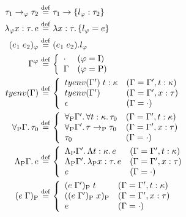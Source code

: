 \begin{align*}
  \tau_1 \to_\varphi \tau_2 &\mathrel{\overset{\mathrm{def}}{=}} \tau_1 \to \{l_\varphi: \tau_2\} \\
  \lambda_\varphi x: \tau\ldotp e &\mathrel{\overset{\mathrm{def}}{=}} \lambda x: \tau\ldotp \{l_\varphi = e\} \\
  (e_1\; e_2)_\varphi &\mathrel{\overset{\mathrm{def}}{=}} (e_1\; e_2).l_\varphi \\
  \Gamma^\varphi &\mathrel{\overset{\mathrm{def}}{=}} \left\{\begin{array}{ll}
    \cdot &(\varphi = \mathrm{I}) \\
    \Gamma &(\varphi = \mathrm{P})
  \end{array}\right. \\
  \mathop{tyenv}(\Gamma) &\mathrel{\overset{\mathrm{def}}{=}} \left\{\begin{array}{ll}
    \mathop{tyenv}(\Gamma')\; t: \kappa &(\Gamma = \Gamma', t: \kappa) \\
    \mathop{tyenv}(\Gamma') &(\Gamma = \Gamma', x: \tau) \\
    \epsilon &(\Gamma = \cdot)
  \end{array}\right. \\
  \forall_{\mathrm{P}} \Gamma\ldotp \tau_0 &\mathrel{\overset{\mathrm{def}}{=}} \left\{\begin{array}{ll}
    \forall_{\mathrm{P}} \Gamma'\ldotp \forall t: \kappa\ldotp \tau_0 &(\Gamma = \Gamma', t: \kappa) \\
    \forall_{\mathrm{P}} \Gamma'\ldotp \tau \to_{\mathrm{P}} \tau_0 &(\Gamma = \Gamma', x: \tau) \\
    \tau_0 &(\Gamma = \cdot)
  \end{array}\right. \\
  \Lambda_{\mathrm{P}} \Gamma\ldotp e &\mathrel{\overset{\mathrm{def}}{=}} \left\{\begin{array}{ll}
    \Lambda_{\mathrm{P}} \Gamma'\ldotp \Lambda t: \kappa\ldotp e &(\Gamma = \Gamma', t: \kappa) \\
    \Lambda_{\mathrm{P}} \Gamma'\ldotp \lambda_{\mathrm{P}} x: \tau\ldotp e &(\Gamma = \Gamma', x: \tau) \\
    e &(\Gamma = \cdot)
  \end{array}\right. \\
  (e\; \Gamma)_{\mathrm{P}} &\mathrel{\overset{\mathrm{def}}{=}} \left\{\begin{array}{ll}
    (e\; \Gamma')_{\mathrm{P}}\; t &(\Gamma = \Gamma', t: \kappa) \\
    ((e\; \Gamma')_{\mathrm{P}}\; x)_{\mathrm{P}} &(\Gamma = \Gamma', x: \tau) \\
    e &(\Gamma = \cdot)
  \end{array}\right.
\end{align*}

